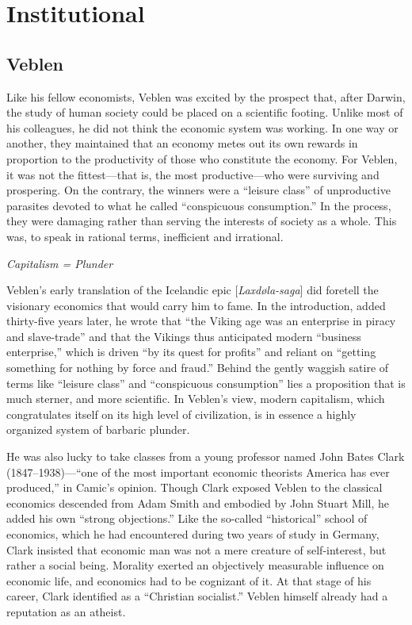 \documentclass[
]{book}
\begin{document}
\hypertarget{institutional}{%
\chapter{Institutional}\label{institutional}}

\hypertarget{veblen}{%
\section{Veblen}\label{veblen}}

Like his fellow economists, Veblen was excited by the prospect that, after Darwin, the study of human society could be placed on a scientific footing. Unlike most of his colleagues, he did not think the economic system was working. In one way or another, they maintained that an economy metes out its own rewards in proportion to the productivity of those who constitute the economy. For Veblen, it was not the fittest---that is, the most productive---who were surviving and prospering. On the contrary, the winners were a ``leisure class'' of unproductive parasites devoted to what he called ``conspicuous consumption.'' In the process, they were damaging rather than serving the interests of society as a whole. This was, to speak in rational terms, inefficient and irrational.

\emph{Capitalism = Plunder}

Veblen's early translation of the Icelandic epic {[}\emph{Laxdøla-saga}{]} did foretell the visionary economics that would carry him to fame. In the introduction, added thirty-five years later, he wrote that ``the Viking age was an enterprise in piracy and slave-trade'' and that the Vikings thus anticipated modern ``business enterprise,'' which is driven ``by its quest for profits'' and reliant on ``getting something for nothing by force and fraud.'' Behind the gently waggish satire of terms like ``leisure class'' and ``conspicuous consumption'' lies a proposition that is much sterner, and more scientific. In Veblen's view, modern capitalism, which congratulates itself on its high level of civilization, is in essence a highly organized system of barbaric plunder.

He was also lucky to take classes from a young professor named John Bates Clark (1847--1938)---``one of the most important economic theorists America has ever produced,'' in Camic's opinion. Though Clark exposed Veblen to the classical economics descended from Adam Smith and embodied by John Stuart Mill, he added his own ``strong objections.'' Like the so-called ``historical'' school of economics, which he had encountered during two years of study in Germany, Clark insisted that economic man was not a mere creature of self-interest, but rather a social being. Morality exerted an objectively measurable influence on economic life, and economics had to be cognizant of it. At that stage of his career, Clark identified as a ``Christian socialist.'' Veblen himself already had a reputation as an atheist.
\end{document}

